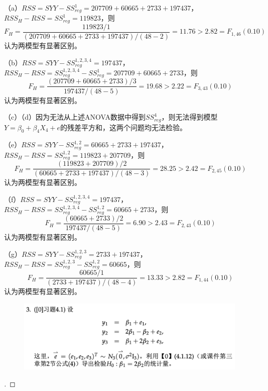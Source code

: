\documentclass[cn,hazy,green,12pt,normal]{elegantnote}
\numberwithin{equation}{section}
\numberwithin{subsection}{section}
\begin{document}
（a）$RSS = SYY - SS_{reg}^1 = 207709 + 60665 + 2733 + 197437$，$RSS_H - RSS = SS_{reg}^1 = 119823$，则
$$
F_H = \frac{119823 / 1}{(207709 + 60665 + 2733 + 197437) / (48-2)} = 11.76 > 2.82 = F_{1,46}(0.10)
$$
认为两模型有显著区别。

（b）$RSS = SYY - SS_{reg}^{1,2,3,4} = 197437$，$RSS_H - RSS = SS_{reg}^{1,2,3,4} - SS_{reg}^1 = 207709 + 60665 + 2733$，则
$$
F_H = \frac{(207709 + 60665 + 2733) / 3}{197437 / (48-5)} = 19.68 > 2.22 = F_{3,43}(0.10)
$$
认为两模型有显著区别。

（c）（d）因为无法从上述ANOVA数据中得到$SS_{reg}^4$，则无法得到模型$Y = \beta_0 + \beta_4 X_4 + e$的残差平方和，这两个问题均无法检验。

（e）$RSS = SYY - SS_{reg}^{1,2} = 60665 + 2733 + 197437$，$RSS_H - RSS = SS_{reg}^{1,2} = 119823 + 207709$，则
$$
F_H = \frac{(119823 + 207709) / 2}{(60665 + 2733 + 197437) / (48-3)} = 28.25 > 2.42 = F_{2,45}(0.10)
$$
认为两模型有显著区别。

（f）$RSS = SYY - SS_{reg}^{1,2,3,4} = 197437$，$RSS_H - RSS = SS_{reg}^{1,2,3,4} - SS_{reg}^{1,2} = 60665 + 2733$，则
$$
F_H = \frac{(60665 + 2733) / 2}{197437 / (48-5)} = 6.90 > 2.43 = F_{2,43}(0.10)
$$
认为两模型有显著区别。

（g）$RSS = SYY - SS_{reg}^{1,2,3} = 2733 + 197437$，$RSS_H - RSS = SS_{reg}^{1,2,3} - SS_{reg}^{1,2} = 60665$，则
$$
F_H = \frac{60665 / 1}{(2733 + 197437) / (48-4)} = 13.33 > 2.82 = F_{1,44}(0.10)
$$
认为两模型有显著区别。


\newpage

\begin{homework}
\end{homework}

    \begin{figure}[!htbp]
        \centering
        \includegraphics[width=30em]{image/hw4_plt3.png}
    \end{figure}

\begin{proof}[\solutionname]
\end{proof}
\end{document}
